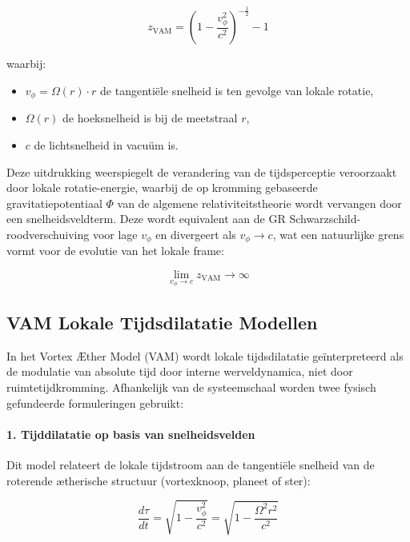 \begin{equation}
    z_{\text{VAM}} =
    \left( 1 - \frac{v_\phi^2}{c^2} \right)^{-\frac{1}{2}} - 1
\end{equation}

waarbij:
\begin{itemize}
    \item \( v_\phi = \Omega(r) \cdot r \) de tangentiële snelheid is ten gevolge van lokale rotatie,
    \item \( \Omega(r) \) de hoeksnelheid is bij de meetstraal \( r \),
    \item \( c \) de lichtsnelheid in vacuüm is.
\end{itemize}

Deze uitdrukking weerspiegelt de verandering van de tijdsperceptie veroorzaakt door lokale rotatie-energie, waarbij de op kromming gebaseerde gravitatiepotentiaal \( \Phi \) van de algemene relativiteitstheorie wordt vervangen door een snelheidsveldterm. Deze wordt equivalent aan de GR Schwarzschild-roodverschuiving voor lage \( v_\phi \) en divergeert als \( v_\phi \rightarrow c \), wat een natuurlijke grens vormt voor de evolutie van het lokale frame:

\begin{equation}
    \lim_{v_\phi \to c} z_{\text{VAM}} \to \infty
\end{equation}

\subsection*{VAM Lokale Tijdsdilatatie Modellen}

In het Vortex Æther Model (VAM) wordt lokale tijdsdilatatie geïnterpreteerd als de modulatie van absolute tijd door interne werveldynamica, niet door ruimtetijdkromming. Afhankelijk van de systeemschaal worden twee fysisch gefundeerde formuleringen gebruikt:

\paragraph{1. Tijddilatatie op basis van snelheidsvelden}

Dit model relateert de lokale tijdstroom aan de tangentiële snelheid van de roterende ætherische structuur (vortexknoop, planeet of ster):

\begin{equation}
    \frac{d\tau}{dt} =
    \sqrt{1 - \frac{v_\phi^2}{c^2}} =
    \sqrt{1 - \frac{\Omega^2 r^2}{c^2}}
\end{equation}

